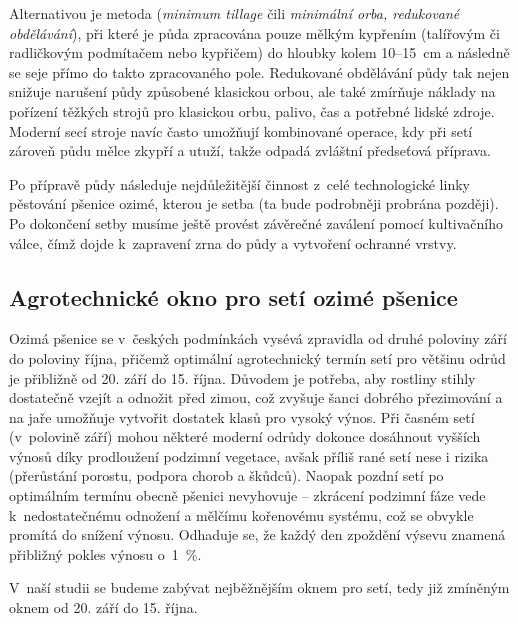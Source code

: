 \documentclass[11pt,a4paper]{article}
\begin{document}
Alternativou je metoda  (\emph{minimum tillage} čili \emph{minimální orba, redukované obdělávání}), při které je půda zpracována pouze mělkým kypřením (talířovým či radličkovým podmítačem nebo kypřičem) do hloubky kolem 10--15~cm a následně se seje přímo do takto zpracovaného pole\cite{agromanuál-klasika-vs-min-till}. Redukované obdělávání půdy tak nejen snižuje narušení půdy způsobené klasickou orbou, ale také zmírňuje náklady na pořízení těžkých strojů pro klasickou orbu, palivo, čas a potřebné lidské zdroje\cite{kuhn-min-till}. Moderní secí stroje navíc často umožňují kombinované operace, kdy při setí zároveň půdu mělce zkypří a utuží, takže odpadá zvláštní předseťová příprava\cite{pöttinger-efektivní-výroba}.

Po přípravě půdy následuje nejdůležitější činnost z~celé technologické linky pěstování pšenice ozimé, kterou je setba (ta bude podrobněji probrána později). Po dokončení setby musíme ještě provést závěrečné zaválení pomocí kultivačního válce, čímž dojde k~zapravení zrna do půdy a vytvoření ochranné vrstvy.

\subsection{Agrotechnické okno pro setí ozimé pšenice}\label{agrotechnicke-okno}

Ozimá pšenice se v~českých podmínkách vysévá zpravidla od druhé poloviny září do poloviny října, přičemž optimální agrotechnický termín setí pro většinu odrůd je přibližně od 20. září do 15. října\cite{wikifarmer-kdy-pěstovat}. Důvodem je potřeba, aby rostliny stihly dostatečně vzejít a odnožit před zimou, což zvyšuje šanci dobrého přezimování a na jaře umožňuje vytvořit dostatek klasů pro vysoký výnos. Při časném setí (v~polovině září) mohou některé moderní odrůdy dokonce dosáhnout vyšších výnosů díky prodloužení podzimní vegetace\cite{úroda-časné-setí}, avšak příliš rané setí nese i rizika (přerůstání porostu, podpora chorob a škůdců)\cite{úroda-časné-setí}. Naopak pozdní setí po optimálním termínu obecně pšenici nevyhovuje -- zkrácení podzimní fáze vede k~nedostatečnému odnožení a mělčímu kořenovému systému, což se obvykle promítá do snížení výnosu. Odhaduje se, že každý den zpoždění výsevu znamená přibližný pokles výnosu o~1~\%\cite{mdpi-pozdní-setí}.

V~naší studii se budeme zabývat nejběžnějším oknem pro setí, tedy již zmíněným oknem od 20. září do 15. října\cite{wikifarmer-kdy-pěstovat}.
\end{document}
